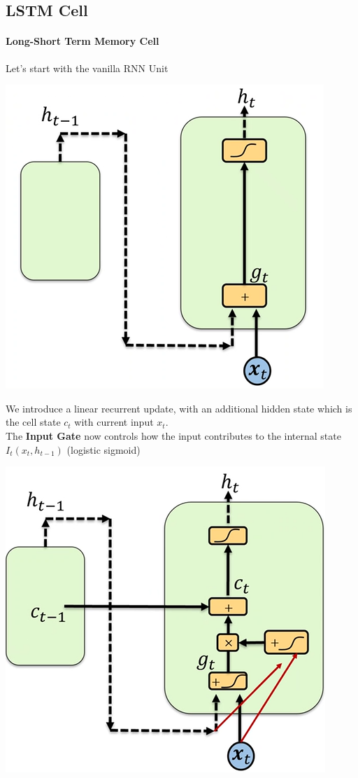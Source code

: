 \documentclass[10pt]{report}
\begin{document}
\subsection{LSTM Cell}
\paragraph{Long-Short Term Memory Cell} Let's start with the vanilla RNN Unit
\begin{center}
	\includegraphics[scale=0.33]{94.png}
\end{center}
We introduce a linear recurrent update, with an additional hidden state which is the cell state $c_t$ with current input $x_t$.\\
The \textbf{Input Gate} now controls how the input contributes to the internal state $I_t(x_t, h_{t-1})$ (logistic sigmoid)
\begin{center}
	\includegraphics[scale=0.33]{95.png}
\end{center}
\end{document}
